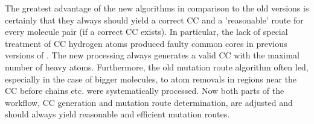 The greatest advantage of the new algorithms in comparison to the old versions is certainly that they always should yield a correct CC and a 'reasonable' route for every molecule pair (if a correct CC exists). In particular, the lack of special treatment of CC hydrogen atoms produced faulty common cores in previous versions of {\trafo}. The new processing always generates a valid CC with the maximal number of heavy atoms. Furthermore, the old mutation route algorithm often led, especially in the case of bigger molecules, to atom removals in regions near the CC before chains etc. were systematically processed. Now both parts of the workflow, CC generation and mutation route determination, are adjusted and should always yield reasonable and efficient mutation routes.

